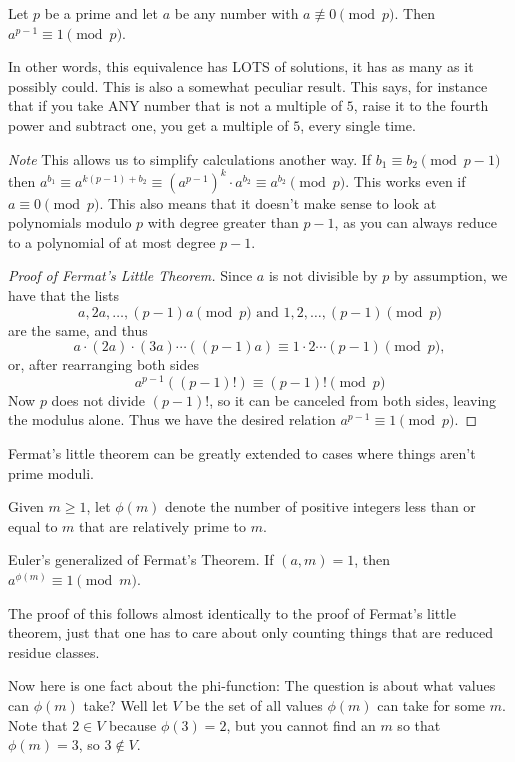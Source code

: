 \documentclass[letterpaper, 11 pt]{article}
\begin{document}
\begin{thm} Let $p$ be a prime and let $a$ be any number with $a \not\equiv 0 \pmod{p}$. Then $a^{p-1} \equiv 1 \pmod{p}$.\end{thm}

In other words, this equivalence has LOTS of solutions, it has as many as it possibly could. This is also a somewhat peculiar result. This says, for instance that if you take ANY number that is not a multiple of $5$, raise it to the fourth power and subtract one, you get a multiple of $5$, every single time. 

\emph{Note} This allows us to simplify calculations another way. If $b_1\equiv b_2 \pmod{p-1}$ then $a^{b_1} \equiv a^{k(p-1) +b_2} \equiv (a^{p-1})^k \cdot a^{b_2} \equiv a^{b_2} \pmod{p}$. This works even if $a\equiv 0 \pmod{p}$. This also means that it doesn't make sense to look at polynomials modulo $p$ with degree greater than $p-1$, as you can always reduce to a polynomial of at most degree $p-1$.


\begin{proof}[Proof of Fermat's Little Theorem] Since $a$ is not divisible by $p$ by assumption, we have that the lists
\[
a,2a,\dots,(p-1)a \pmod{p} \text{ and } 1,2,\dots,(p-1) \pmod{p}
\]
are the same, and thus
\[
a\cdot (2a) \cdot (3a) \cdots ((p-1)a) \equiv 1\cdot 2 \cdots (p-1) \pmod{p},
\]
or, after rearranging both sides
\[
a^{p-1} ((p-1)!) \equiv (p-1)! \pmod{p}
\]
Now $p$ does not divide $(p-1)!$, so it can be canceled from both sides, leaving the modulus alone. Thus we have the desired relation $a^{p-1} \equiv 1 \pmod{p}$.
\end{proof}


Fermat's little theorem can be greatly extended to cases where things aren't prime moduli. 

\begin{defn}Given $m\ge 1$, let $\phi(m)$ denote the number of positive integers less than or equal to $m$ that are relatively prime to $m$. %
\end{defn}

\begin{thm}[Theorem 5.3] Euler's generalized of Fermat's Theorem. If $(a,m)=1$, then $a^{\phi(m)} \equiv 1 \!\pmod{m}$. \end{thm}

The proof of this follows almost identically to the proof of Fermat's little theorem, just that one has to care about only counting things that are reduced residue classes.

\vspace{1cm}

Now here is one fact about the phi-function: The question is about what values can $\phi(m)$ take? Well let $V$ be the set of all values $\phi(m)$ can take for some $m$. Note that $2\in V$ because $\phi(3)=2$, but you cannot find an $m$ so that $\phi(m)=3$, so $3\not \in V$. 
\end{document}
